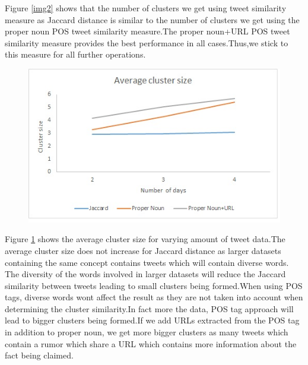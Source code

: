			Figure \ref{img2} shows that the number of clusters we get using tweet similarity measure as Jaccard distance is similar to the number of clusters we get using the proper noun POS tweet similarity measure.The proper noun+URL POS tweet similarity measure provides the best performance in all cases.Thus,we stick to this measure for all further operations.
						
		\begin{figure}[H]
							\centering
							\begin{minipage}{.7\linewidth}
								\includegraphics[width=\linewidth]{images/result3new.jpg}
								\label{img3}
								\end{minipage}
		\end{figure}
		
		Figure \ref{img3} shows the average cluster size for varying amount of tweet data.The average cluster size does not increase for Jaccard distance as larger datasets containing the same concept contains tweets which will contain diverse words. The diversity of the words involved in larger datasets will reduce the Jaccard similarity between tweets leading to small clusters being formed.When using POS tags, diverse words wont affect the result as they are not taken into account when determining the cluster similarity.In fact more the data, POS tag approach will lead to bigger clusters being formed.If we add URLs extracted from the POS tag in addition to proper noun, we get more bigger clusters as many tweets which contain a rumor which share a URL which contains more information about the fact being claimed.
								
